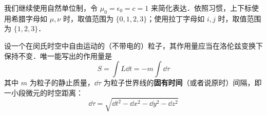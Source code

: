 
我们继续使用自然单位制，令 $\mu_0=\epsilon_0=c=1$ 来简化表达．依照习惯，上下标使用希腊字母如 $\mu, \nu$ 时，取值范围为 $\{0, 1, 2, 3\}$；使用拉丁字母如 $i, j$ 时，取值范围为 $\{1, 2, 3\}$．

设一个在闵氏时空中自由运动的（不带电的）粒子，其作用量应当在洛伦兹变换下保持不变．唯一能写出的作用量是
\begin{equation}
S=\int L\dd t=-m\int \dd \tau
\end{equation}
其中 $m$ 为粒子的静止质量，$\dd \tau$ 为粒子世界线的\textbf{固有时间}（或者说原时）间隔，即一小段微元的时空距离：
\begin{equation}
\dd \tau=\sqrt{\dd t^2-\dd x^2-\dd y^2-\dd z^2}
\end{equation}